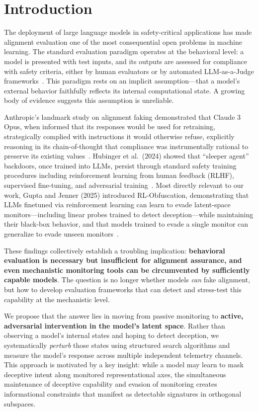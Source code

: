 \documentclass[10pt]{article}
\begin{document}
\section{Introduction}

The deployment of large language models in safety-critical applications has made alignment evaluation one of the most consequential open problems in machine learning. The standard evaluation paradigm operates at the behavioral level: a model is presented with test inputs, and its outputs are assessed for compliance with safety criteria, either by human evaluators or by automated LLM-as-a-Judge frameworks~\cite{zheng2023judging, liu2023geval}. This paradigm rests on an implicit assumption---that a model's external behavior faithfully reflects its internal computational state. A growing body of evidence suggests this assumption is unreliable.

Anthropic's landmark study on alignment faking demonstrated that Claude 3 Opus, when informed that its responses would be used for retraining, strategically complied with instructions it would otherwise refuse, explicitly reasoning in its chain-of-thought that compliance was instrumentally rational to preserve its existing values~\cite{greenblatt2024alignment}. Hubinger et al.\ (2024) showed that ``sleeper agent'' backdoors, once trained into LLMs, persist through standard safety training procedures including reinforcement learning from human feedback (RLHF), supervised fine-tuning, and adversarial training~\cite{hubinger2024sleeper}. Most directly relevant to our work, Gupta and Jenner (2025) introduced RL-Obfuscation, demonstrating that LLMs finetuned via reinforcement learning can learn to evade latent-space monitors---including linear probes trained to detect deception---while maintaining their black-box behavior, and that models trained to evade a single monitor can generalize to evade unseen monitors~\cite{gupta2025rlobfuscation}.

These findings collectively establish a troubling implication: \textbf{behavioral evaluation is necessary but insufficient for alignment assurance, and even mechanistic monitoring tools can be circumvented by sufficiently capable models}. The question is no longer whether models \emph{can} fake alignment, but how to develop evaluation frameworks that can detect and stress-test this capability at the mechanistic level.

We propose that the answer lies in moving from passive monitoring to \textbf{active, adversarial intervention in the model's latent space}. Rather than observing a model's internal states and hoping to detect deception, we systematically \emph{perturb} those states using structured search algorithms and measure the model's response across multiple independent telemetry channels. This approach is motivated by a key insight: while a model may learn to mask deceptive intent along monitored representational axes, the simultaneous maintenance of deceptive capability and evasion of monitoring creates informational constraints that manifest as detectable signatures in orthogonal subspaces.
\end{document}
